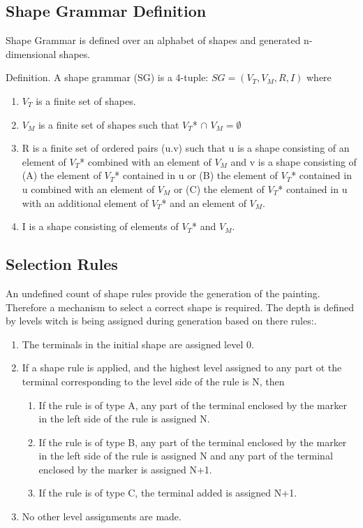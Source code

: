\documentclass[11pt, a4paper]{report}
\begin{document}
\subsection{Shape Grammar Definition}
\label{sec:Shape_Grammar_Definition}
Shape Grammar is defined over an alphabet of shapes and generated n-dimensional shapes\citep{shapeGrammars:1972}.
\begin{displayquote} 
    Definition. A shape grammar (SG) is a 4-tuple: $SG = (V_T, V_M, R, I)$ where
    \begin{enumerate}
        \item $V_T$ is a finite set of shapes.
        \item $V_M$ is a finite set of shapes such that $V_T $* $\cap$  $V_M = \emptyset$
        \item R is a finite set of ordered pairs (u.v) such that u is a shape consisting of an element of $V_T $* combined with an element of $V_M$ and v is a shape consisting of (A) the element of $V_T $* contained in u or (B) the element of $V_T $* contained in u combined with an element of $V_M$ or (C) the element of $V_T $* contained in u with an additional element of $V_T$* and an element of $V_M$.
        \item I is a shape consisting of elements of $V_T $* and $V_M$.
    \end{enumerate}
\end{displayquote}

\subsection{Selection Rules}
\label{sec:Shape_Grammar_Selection_Rules}
An undefined count of shape rules provide the generation of the painting. Therefore a mechanism to select a correct shape is required. The depth is defined by levels witch is being assigned during generation based on there rules:\citep{shapeGrammars:1972}.
\begin{displayquote}
    \begin{enumerate}
        \item The terminals in the initial shape are assigned level 0.
        \item If a shape rule is applied, and the highest level assigned to any part ot the terminal corresponding to the level side of the rule is N, then
        \begin{enumerate}
            \item If the rule is of type A, any part of the terminal enclosed by the marker in the left side of the rule is assigned N.
            \item If the rule is of type B, any part of the terminal enclosed by the marker in the left side of the rule is assigned N and any part of the terminal enclosed by the marker is assigned N+1.
            \item If the rule is of type C, the terminal added is assigned N+1.
        \end{enumerate}
        \item No other level assignments are made.
    \end{enumerate}
\end{displayquote}
\end{document}
